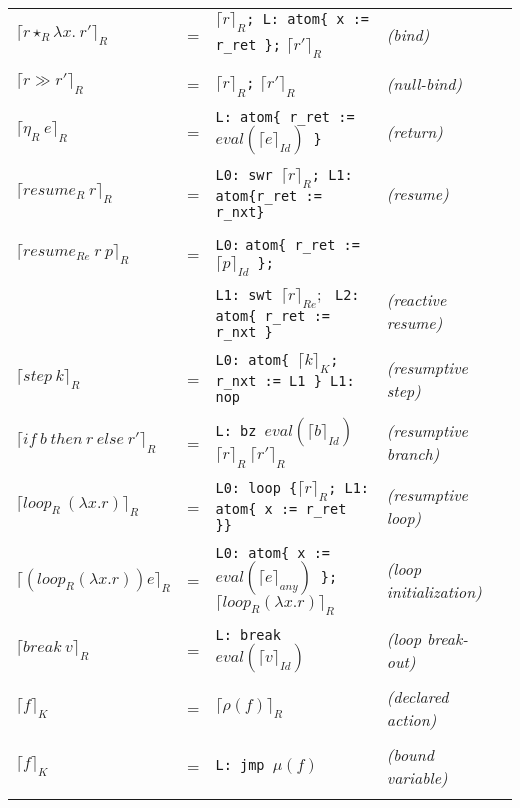 \documentclass{article}
\newcommand{\compile}[2]{\lceil #2 \rceil_{#1}}
\newcommand{\atom}[1]{\texttt{atom\{ #1 \}}}
\newcommand{\nullbind}[0]{\gg}
\begin{document}
\begin{tabular}[t]{lllll}
$\compile{R}{r \star_R \lambda x.\ r\prime}$ &=& $\compile{R}{r}$\texttt{; L: \atom{x := r\_ret};} $\compile{R}{r\prime}$ &\emph{(bind)}\\
\\
$\compile{R}{r \nullbind r\prime}$ &=& $\compile{R}{r}$\texttt{;} $\compile{R}{r\prime}$&\emph{(null-bind)}\\
\\
$\compile{R}{\eta_R\ e}$ &=& \texttt{L: }\atom{\texttt{r\_ret := }$eval(\compile{Id}{e})$}&\emph{(return)}\\
\\
$\compile{R}{resume_{R}\ r}$ &=& \texttt{L0: swr }$\compile{R}{r}$\texttt{; L1: atom\{r\_ret := r\_nxt\}}&\emph{(resume)}\\
\\
$\compile{R}{resume_{Re}\ r\ p}$ &=& \texttt{L0:} \atom{r\_ret := $\compile{Id}{p}$}\texttt{;}\\
&&\texttt{L1: swt }$\compile{Re}{r}$; \texttt{ L2: }\atom{ r\_ret := r\_nxt}&\emph{(reactive resume)}\\
\\
$\compile{R}{step\ k}$ &=& \texttt{L0: }\atom{$\compile{K}{k}$; r\_nxt := L1}\texttt{ L1: nop}&\emph{(resumptive step)}\\
\\
$\compile{R}{if\ b\ then\ r\ else\ r\prime}$ &=& \texttt{L: bz }$eval(\compile{Id}{b})$ $\compile{R}{r}\ \compile{R}{r\prime}$&\emph{(resumptive branch)}\\
\\
$\compile{R}{loop_R\ (\lambda x.r)}$ &=& \texttt{L0: loop \{}$\compile{R}{r}$\texttt{; L1: }\atom{x := r\_ret}\texttt{\}}&\emph{(resumptive loop)}\\
\\
$\compile{R}{(loop_R (\lambda x.r)) e}$ &=& \texttt{L0: }\atom{x := $eval(\compile{any}{e})$}\texttt{; }$\compile{R}{loop_R (\lambda x.r)}$&\emph{(loop initialization)}\\
\\
$\compile{R}{break\ v}$ &=& \texttt{L: break $eval(\compile{Id}{v})$}&\emph{(loop break-out)}\\
\\
$\compile{K}{f}$ &=& $\compile{R}{\rho(f)}$ &\emph{(declared action)}\\
\\
$\compile{K}{f}$ &=& \texttt{L: jmp }$\mu(f)$ &\emph{(bound variable)}\\
\\
\end{tabular}
\end{document}
